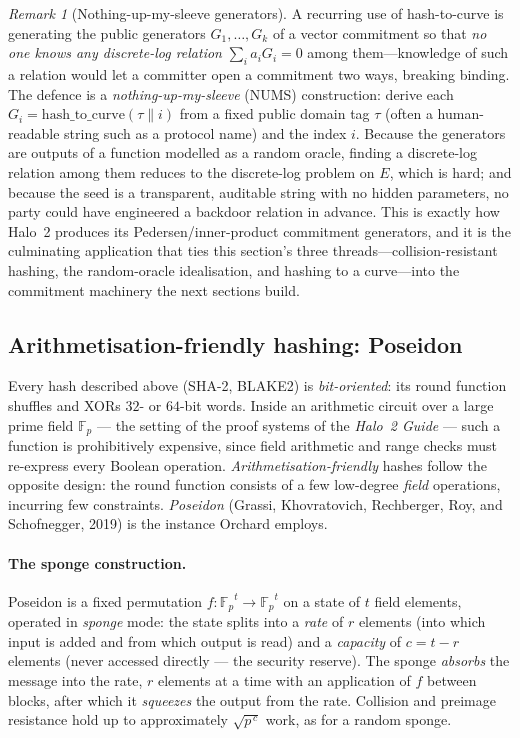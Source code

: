 \documentclass[11pt,a4paper]{article}
\theoremstyle{definition}
\theoremstyle{remark}
\newtheorem{remark}[theorem]{Remark}
\newcommand{\Fp}{\ensuremath{\mathbb{F}_{p}}}
\begin{document}
\begin{remark}[Nothing-up-my-sleeve generators]\label{hash:rem:nums}
A recurring use of hash-to-curve is generating the public generators \(G_{1},\dots,G_{k}\) of a vector commitment so that \emph{no one knows any discrete-log relation} \(\sum_{i} a_{i} G_{i} = 0\) among them---knowledge of such a relation would let a committer open a commitment two ways, breaking binding. The defence is a \emph{nothing-up-my-sleeve} (NUMS) construction: derive each \(G_{i} = \mathrm{hash\_to\_curve}(\tau \mathbin{\|} i)\) from a fixed public domain tag \(\tau\) (often a human-readable string such as a protocol name) and the index \(i\). Because the generators are outputs of a function modelled as a random oracle, finding a discrete-log relation among them reduces to the discrete-log problem on \(E\), which is hard; and because the seed is a transparent, auditable string with no hidden parameters, no party could have engineered a backdoor relation in advance. This is exactly how Halo~2 produces its Pedersen/inner-product commitment generators, and it is the culminating application that ties this section's three threads---collision-resistant hashing, the random-oracle idealisation, and hashing to a curve---into the commitment machinery the next sections build.
\end{remark}
\subsection{Arithmetisation-friendly hashing: Poseidon}\label{hash:subsec:poseidon}
Every hash described above (SHA-2, BLAKE2) is \emph{bit-oriented}: its round function
shuffles and XORs $32$- or $64$-bit words. Inside an arithmetic circuit over a
large prime field \(\Fp\) --- the setting of the proof systems of the
\emph{Halo~2 Guide} --- such a function is prohibitively expensive, since field
arithmetic and range checks must re-express every Boolean operation.
\emph{Arithmetisation-friendly} hashes follow the opposite design: the
round function consists of a few low-degree \emph{field} operations, incurring few
constraints. \emph{Poseidon} (Grassi, Khovratovich, Rechberger, Roy, and
Schofnegger, 2019) is the instance Orchard employs.

\paragraph{The sponge construction.} Poseidon is a fixed permutation
\(f \colon \Fp^{t} \to \Fp^{t}\) on a state of \(t\) field elements, operated in
\emph{sponge} mode: the state splits into a \emph{rate} of \(r\) elements (into
which input is added and from which output is read) and a \emph{capacity} of \(c = t - r\) elements
(never accessed directly --- the security reserve). The sponge \emph{absorbs} the
message into the rate, \(r\) elements at a time with an application of \(f\) between
blocks, after which it \emph{squeezes} the output from the rate. Collision and preimage
resistance hold up to approximately \(\sqrt{p^{\,c}}\) work, as for a random sponge.
\end{document}
